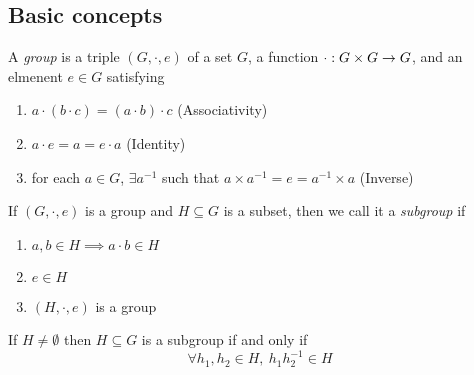 \documentclass{article}
\begin{document}
\subsection{Basic concepts}
\begin{defi}[Group]
    A \emph{group} is a triple $(G, \cdot, e)$ of a set $G$, a function ${\cdot : G \times G \rightarrow G}$, and an elmenent $e \in G$ satisfying
    \begin{enumerate}[label=(G\arabic*)]
        \item $a \cdot (b \cdot c) = (a \cdot b) \cdot c$ \hspace*{\fill}(Associativity)
        \item $a \cdot e = a = e \cdot a$ \hspace*{\fill}(Identity)
        \item for each $a \in G$, $\exists a^{-1}$ such that $a \times a^{-1} = e = a^{-1} \times a$ \hspace*{\fill}(Inverse)
    \end{enumerate}
\end{defi}
\begin{defi}[Subgroup]
    If $(G, \cdot, e)$ is a group and $H \subseteq G$ is a subset, then we call it a \emph{subgroup} if
    \begin{enumerate}
        \item $a, b \in H \implies a \cdot b \in H$
        \item $e \in H$
        \item $(H, \cdot, e)$ is a group
    \end{enumerate}
\end{defi}
\begin{lemma}
    If $H \neq \emptyset$ then $H \subseteq G$ is a subgroup if and only if $$ \forall h_1, h_2 \in H, \ h_1h_2^{-1} \in H$$
\end{lemma}
\end{document}
